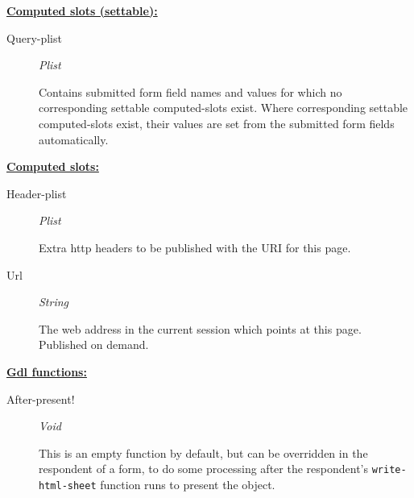 \documentclass [11pt]{book}
\begin{document}
\begin{itemize}
\begin{description}
\end{description}






\textbf{
\underline{Computed slots (settable):}}

\begin{description}

\item [Query-plist]
\emph{Plist}

 Contains submitted form field names and values for which no corresponding settable
computed-slots exist. Where corresponding settable computed-slots exist, their values are set from
the submitted form fields automatically.




\end{description}






\textbf{
\underline{Computed slots:}}

\begin{description}

\item [Header-plist]
\emph{Plist}

 Extra http headers to be published with the URI for this page.




\item [Url]
\emph{String}

 The web address in the current session which points at this page. Published on demand.




\end{description}






\textbf{
\underline{Gdl functions:}}

\begin{description}

\item [After-present!]
\emph{Void}

 This is an empty function by default, but can be overridden in
the respondent of a form, to do some processing after the respondent's
\texttt{write-html-sheet} function runs to present the object.





\end{description}
\end{itemize}
\end{document}
